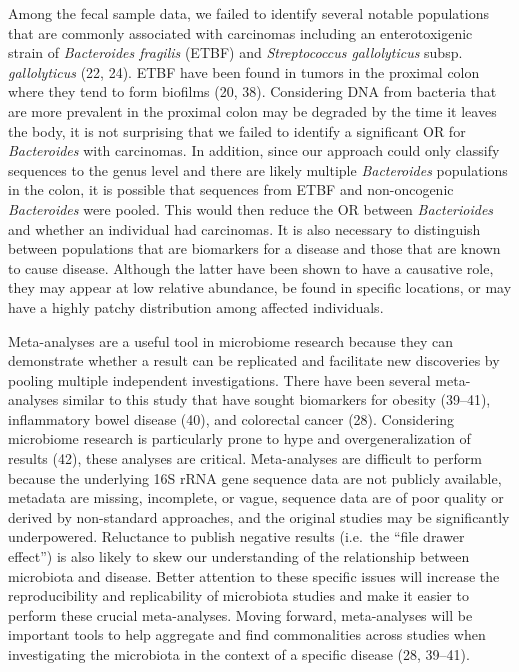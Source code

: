 \documentclass[12pt,]{article}
\begin{document}
Among the fecal sample data, we failed to identify several notable
populations that are commonly associated with carcinomas including an
enterotoxigenic strain of \emph{Bacteroides fragilis} (ETBF) and
\emph{Streptococcus gallolyticus} subsp. \emph{gallolyticus} (22, 24).
ETBF have been found in tumors in the proximal colon where they tend to
form biofilms (20, 38). Considering DNA from bacteria that are more
prevalent in the proximal colon may be degraded by the time it leaves
the body, it is not surprising that we failed to identify a significant
OR for \emph{Bacteroides} with carcinomas. In addition, since our
approach could only classify sequences to the genus level and there are
likely multiple \emph{Bacteroides} populations in the colon, it is
possible that sequences from ETBF and non-oncogenic \emph{Bacteroides}
were pooled. This would then reduce the OR between \emph{Bacterioides}
and whether an individual had carcinomas. It is also necessary to
distinguish between populations that are biomarkers for a disease and
those that are known to cause disease. Although the latter have been
shown to have a causative role, they may appear at low relative
abundance, be found in specific locations, or may have a highly patchy
distribution among affected individuals.

Meta-analyses are a useful tool in microbiome research because they can
demonstrate whether a result can be replicated and facilitate new
discoveries by pooling multiple independent investigations. There have
been several meta-analyses similar to this study that have sought
biomarkers for obesity (39--41), inflammatory bowel disease (40), and
colorectal cancer (28). Considering microbiome research is particularly
prone to hype and overgeneralization of results (42), these analyses are
critical. Meta-analyses are difficult to perform because the underlying
16S rRNA gene sequence data are not publicly available, metadata are
missing, incomplete, or vague, sequence data are of poor quality or
derived by non-standard approaches, and the original studies may be
significantly underpowered. Reluctance to publish negative results
(i.e.~the ``file drawer effect'') is also likely to skew our
understanding of the relationship between microbiota and disease. Better
attention to these specific issues will increase the reproducibility and
replicability of microbiota studies and make it easier to perform these
crucial meta-analyses. Moving forward, meta-analyses will be important
tools to help aggregate and find commonalities across studies when
investigating the microbiota in the context of a specific disease (28,
39--41).
\end{document}
